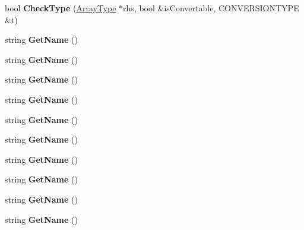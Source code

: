 \begin{DoxyCompactItemize}
\item 
\hypertarget{classArrayType_ad20dee813ec90843a6333e5823e0128a}{bool {\bfseries Check\-Type} (\hyperlink{classArrayType}{Array\-Type} $\ast$rhs, bool \&is\-Convertable, C\-O\-N\-V\-E\-R\-S\-I\-O\-N\-T\-Y\-P\-E \&t)}\label{classArrayType_ad20dee813ec90843a6333e5823e0128a}

\item 
\hypertarget{classType_a8143fe4686ae1a5709a5955396c6ee26}{string {\bfseries Get\-Name} ()}\label{classType_a8143fe4686ae1a5709a5955396c6ee26}

\item 
\hypertarget{classType_a8143fe4686ae1a5709a5955396c6ee26}{string {\bfseries Get\-Name} ()}\label{classType_a8143fe4686ae1a5709a5955396c6ee26}

\item 
\hypertarget{classType_a8143fe4686ae1a5709a5955396c6ee26}{string {\bfseries Get\-Name} ()}\label{classType_a8143fe4686ae1a5709a5955396c6ee26}

\item 
\hypertarget{classType_a8143fe4686ae1a5709a5955396c6ee26}{string {\bfseries Get\-Name} ()}\label{classType_a8143fe4686ae1a5709a5955396c6ee26}

\item 
\hypertarget{classType_a8143fe4686ae1a5709a5955396c6ee26}{string {\bfseries Get\-Name} ()}\label{classType_a8143fe4686ae1a5709a5955396c6ee26}

\item 
\hypertarget{classType_a8143fe4686ae1a5709a5955396c6ee26}{string {\bfseries Get\-Name} ()}\label{classType_a8143fe4686ae1a5709a5955396c6ee26}

\item 
\hypertarget{classType_a8143fe4686ae1a5709a5955396c6ee26}{string {\bfseries Get\-Name} ()}\label{classType_a8143fe4686ae1a5709a5955396c6ee26}

\item 
\hypertarget{classType_a8143fe4686ae1a5709a5955396c6ee26}{string {\bfseries Get\-Name} ()}\label{classType_a8143fe4686ae1a5709a5955396c6ee26}

\item 
\hypertarget{classType_a8143fe4686ae1a5709a5955396c6ee26}{string {\bfseries Get\-Name} ()}\label{classType_a8143fe4686ae1a5709a5955396c6ee26}

\item 
\hypertarget{classType_a8143fe4686ae1a5709a5955396c6ee26}{string {\bfseries Get\-Name} ()}\label{classType_a8143fe4686ae1a5709a5955396c6ee26}


\end{DoxyCompactItemize}
